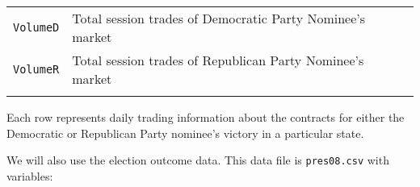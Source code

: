 \documentclass[]{article}
\begin{document}
\begin{longtable}[c]{@{}ll@{}}
\begin{minipage}[t]{0.24\columnwidth}
\texttt{VolumeD}
\end{minipage} & \begin{minipage}[t]{0.69\columnwidth}\raggedright
Total session trades of Democratic Party Nominee's market
\end{minipage}
\\\addlinespace
\begin{minipage}[t]{0.24\columnwidth}\raggedright
\texttt{VolumeR}
\end{minipage} & \begin{minipage}[t]{0.69\columnwidth}\raggedright
Total session trades of Republican Party Nominee's market
\end{minipage}
\\\addlinespace
\bottomrule
\end{longtable}

Each row represents daily trading information about the contracts for
either the Democratic or Republican Party nominee's victory in a
particular state.

We will also use the election outcome data. This data file is
\texttt{pres08.csv} with variables:
\end{document}

